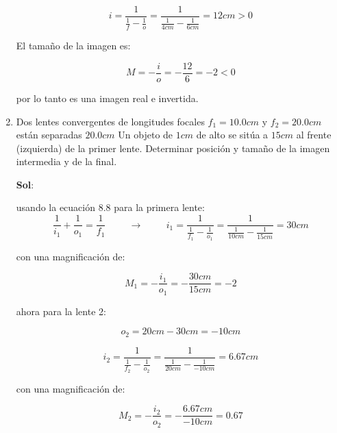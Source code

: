 \documentclass[12pt,a4paper]{article}
\begin{document}
\begin{enumerate}
\begin{equation*}
    i = \frac{1}{\frac{1}{f} - \frac{1}{o}} = \frac{1}{\frac{1}{4cm} - \frac{1}{6cm}} = 12cm > 0
\end{equation*}


El tamaño de la imagen es:

\begin{equation*}
    M = -\frac{i}{o} = -\frac{12}{6} = -2 < 0
\end{equation*}

por lo tanto es una imagen real e invertida.







\item Dos lentes convergentes de longitudes focales $f_1 = 10.0cm$ y $f_2 = 20.0cm$ están separadas $20.0cm$ Un objeto de $1cm$ de alto se sitúa a $15cm$ al frente (izquierda) de la primer lente. Determinar posición y tamaño de la imagen intermedia y de la final.

\textbf{Sol}:

usando la ecuación 8.8 para la primera lente:
\begin{equation*}
    \frac{1}{i_1} +  \frac{1}{o_1} = \frac{1}{f_1} \hspace{1cm} \rightarrow \hspace{1cm} i_1 = \frac{1}{\frac{1}{f_1}- \frac{1}{o_1}} = \frac{1}{\frac{1}{10cm} - \frac{1}{15cm}}= 30cm
\end{equation*}

con una magnificación de:

\begin{equation*}
    M_1= -\frac{i_1}{o_1} = -\frac{30cm}{15cm}=-2
\end{equation*}

ahora para la lente 2:

\begin{equation*}
    o_2 = 20cm-30cm=-10cm
\end{equation*}

\begin{equation*}
    i_2 = \frac{1}{\frac{1}{f_2} - \frac{1}{o_2}} = \frac{1}{\frac{1}{20cm} - \frac{1}{-10cm}} = 6.67 cm
\end{equation*}

con una magnificación de:

\begin{equation*}
    M_2 = -\frac{i_2}{o_2} = -\frac{6.67cm}{-10cm}= 0.67
\end{equation*}




\end{enumerate}
\end{document}
